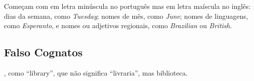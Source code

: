 \documentclass{article}
\begin{document}
\begin{outline}
    \1 Começam com em letra minúscula no português mas em letra maíscula no inglês:
    \2 dias da semana, como \textit{Tuesday};
    \2 nomes de mês, como \textit{June};
    \2 nomes de linguagens, como \textit{Esperanto}, e
    \2 nomes ou adjetivos regionais, como \textit{Brazilian} ou \textit{British}.
\end{outline}

\subsection{Falso Cognatos}

, como ``library'', que não significa ``livraria'', mas biblioteca.

\end{document}
